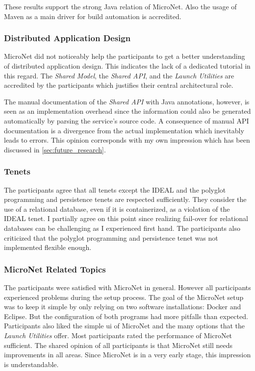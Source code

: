 These results support the strong Java relation of MicroNet. Also the usage of
Maven as a main driver for build automation is accredited.

\subsubsection{Distributed Application Design}

MicroNet did not noticeably help the participants to get a better understanding
of distributed application design. This indicates the lack of a dedicated
tutorial in this regard. The \textit{Shared Model}, the \textit{Shared API}, and
the \textit{Launch Utilities} are accredited by the participants which justifies
their central architectural role.

The manual documentation of the \textit{Shared API} with Java annotations,
however, is seen as an implementation overhead since the information could also
be generated automatically by parsing the service's source code. A consequence
of manual API documentation is a divergence from the actual implementation which
inevitably leads to errors. This opinion corresponds with my own impression
which has been discussed in \autoref{sec:future_research}.

\subsubsection{\msuc{} Tenets}

The participants agree that all tenets except the IDEAL and the polyglot
programming and persistence tenets are respected sufficiently. They consider the
use of a relational database, even if it is containerized, as a violation of the
IDEAL tenet. I partially agree on this point since realizing fail-over for
relational databases can be challenging as I experienced first hand. The
participants also criticized that the polyglot programming and persistence tenet
was not implemented flexible enough.

\subsubsection{MicroNet Related Topics}

The participants were satisfied with MicroNet in general. However all
participants experienced problems during the setup process. The goal of the
MicroNet setup was to keep it simple by only relying on two software
installations: Docker and Eclipse. But the configuration of both programs
had more pitfalls than expected. Participants also liked the simple \gls{ui} of
MicroNet and the many options that the \textit{Launch Utilities} offer. Most
participants rated the performance of MicroNet sufficient. The shared opinion of
all participants is that MicroNet still needs improvements in all areas. Since
MicroNet is in a very early stage, this impression is understandable.


